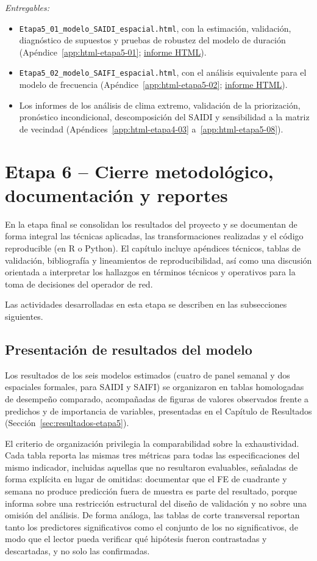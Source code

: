 \textit{Entregables:}
\begin{itemize}
    \item \texttt{Etapa5\_01\_modelo\_SAIDI\_espacial.html}, con la estimación, validación, diagnóstico de supuestos y pruebas de robustez del modelo de duración (Apéndice~\ref{app:html-etapa5-01}; \href{\urlEtapaCincoUno}{informe HTML}).
    \item \texttt{Etapa5\_02\_modelo\_SAIFI\_espacial.html}, con el análisis equivalente para el modelo de frecuencia (Apéndice~\ref{app:html-etapa5-02}; \href{\urlEtapaCincoDos}{informe HTML}).
    \item Los informes de los análisis de clima extremo, validación de la priorización, pronóstico incondicional, descomposición del SAIDI y sensibilidad a la matriz de vecindad (Apéndices~\ref{app:html-etapa4-03} a~\ref{app:html-etapa5-08}).
\end{itemize}

\section{Etapa 6 – Cierre metodológico, documentación y reportes}
\label{sec:metodología-etapa6}

En la etapa final se consolidan los resultados del proyecto y se documentan de forma integral las técnicas aplicadas, las transformaciones realizadas y el código reproducible (en R o Python). El capítulo incluye apéndices técnicos, tablas de validación, bibliografía y lineamientos de reproducibilidad, así como una discusión orientada a interpretar los hallazgos en términos técnicos y operativos para la toma de decisiones del operador de red.

Las actividades desarrolladas en esta etapa se describen en las subsecciones siguientes.

\subsection{Presentación de resultados del modelo}
\label{sec:presentacion_resultados}
Los resultados de los seis modelos estimados (cuatro de panel semanal y dos espaciales formales, para SAIDI y SAIFI) se organizaron en tablas homologadas de desempeño comparado, acompañadas de figuras de valores observados frente a predichos y de importancia de variables, presentadas en el Capítulo de Resultados (Sección~\ref{sec:resultados-etapa5}).

El criterio de organización privilegia la comparabilidad sobre la exhaustividad. Cada tabla reporta las mismas tres métricas para todas las especificaciones del mismo indicador, incluidas aquellas que no resultaron evaluables, señaladas de forma explícita en lugar de omitidas: documentar que el FE de cuadrante y semana no produce predicción fuera de muestra es parte del resultado, porque informa sobre una restricción estructural del diseño de validación y no sobre una omisión del análisis. De forma análoga, las tablas de corte transversal reportan tanto los predictores significativos como el conjunto de los no significativos, de modo que el lector pueda verificar qué hipótesis fueron contrastadas y descartadas, y no solo las confirmadas.

